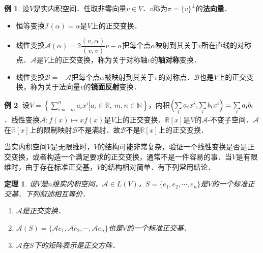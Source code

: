 \documentclass[a4paper,fontset=windows]{ctexbook}
\newtheorem{theorem}{定理}[chapter]
\theoremstyle{definition}
\newtheorem{example}{例}[chapter]
\begin{document}
\begin{example}
设$V$是实内积空间．任取非零向量$v\in V$．$v$称为$\pi=\{v\}^\perp$的{\bf 法向量}．
\begin{itemize}
\item 恒等变换$\mathcal{I}(\alpha)=\alpha$是$V$上的正交变换．

\item 线性变换$\mathcal{A}(\alpha)=2\dfrac{(v,\alpha)}{(v,v)}v-\alpha$把每个点$\alpha$映射到其关于$v$所在直线的对称点．$\mathcal{A}$是$V$上的正交变换，称为关于对称轴$v$的{\bf 轴对称}变换．
\item 线性变换$\mathcal{B}=-\mathcal{A}$把每个点$\alpha$被映射到其关于$\pi$的对称点．$\mathcal{B}$也是$V$上的正交变换，称为关于法向量$v$的{\bf 镜面反射}变换．
\end{itemize}
\end{example}

\begin{example}\label{ex10.15}
设$V=\left\{\left.\sum\limits_{i=-m}^na_ix^i\right|a_i\in\mathbb{R},~m,n\in\mathbb{N}\right\}$，内积$\Bigl(\sum\limits_ia_ix^i,\sum\limits_ib_ix^i\Bigr)=\sum\limits_ia_ib_i$．线性变换$\mathcal{A}:f(x)\mapsto xf(x)$是$V$上的正交变换．$\mathbb{R}[x]$是$V$的$\mathcal{A}$-不变子空间．$\mathcal{A}$在$\mathbb{R}[x]$上的限制映射$\mathcal{B}$不是满射．故$\mathcal{B}$不是$\mathbb{R}[x]$上的正交变换．
\end{example}

当实内积空间$V$是无限维时，$V$的结构可能非常复杂，验证一个线性变换是否是正交变换，或者构造一个满足要求的正交变换，通常不是一件容易的事．当$V$是有限维时，由于存在标准正交基，$V$的结构相对简单．有下列常用结论．

\begin{theorem}\label{thm10.10}
设$V$是$n$维实内积空间，$\mathcal{A}\in L(V)$，$S=\{e_1,e_2,\cdots,e_n\}$是$V$的一个标准正交基．下列叙述相互等价．
\begin{enumerate}
\item $\mathcal{A}$是正交变换．

\item $\mathcal{A}(S)=\{\mathcal{A}e_1,\mathcal{A}e_2,\cdots,\mathcal{A}e_n\}$也是$V$的一个标准正交基．

\item $\mathcal{A}$在$S$下的矩阵表示是正交方阵．
\end{enumerate}
\end{theorem}
\end{document}
